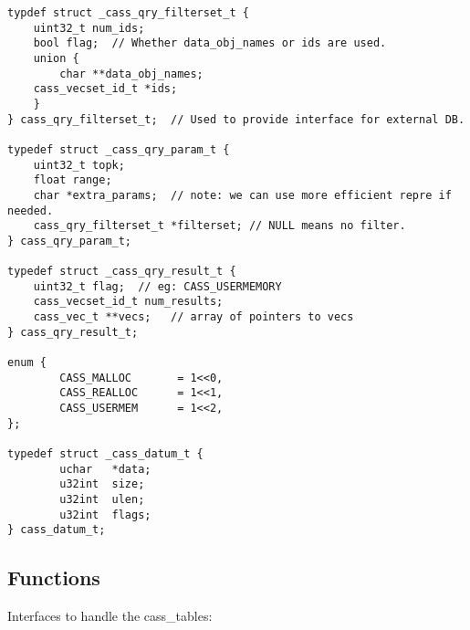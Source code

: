 \begin{verbatim}
typdef struct _cass_qry_filterset_t {
    uint32_t num_ids;
    bool flag;  // Whether data_obj_names or ids are used.
    union {
        char **data_obj_names; 
	cass_vecset_id_t *ids;
    }
} cass_qry_filterset_t;  // Used to provide interface for external DB.

typedef struct _cass_qry_param_t {
    uint32_t topk;
    float range;
    char *extra_params;  // note: we can use more efficient repre if needed.
    cass_qry_filterset_t *filterset; // NULL means no filter.
} cass_qry_param_t;

typedef struct _cass_qry_result_t {
    uint32_t flag;  // eg: CASS_USERMEMORY
    cass_vecset_id_t num_results;
    cass_vec_t **vecs;   // array of pointers to vecs
} cass_qry_result_t;

enum {
        CASS_MALLOC       = 1<<0,
        CASS_REALLOC      = 1<<1,
        CASS_USERMEM      = 1<<2,
};

typedef struct _cass_datum_t {
        uchar   *data;
        u32int  size;
        u32int  ulen;
        u32int  flags;
} cass_datum_t;

\end{verbatim}

\subsection {Functions}
Interfaces to handle the cass\_tables:

